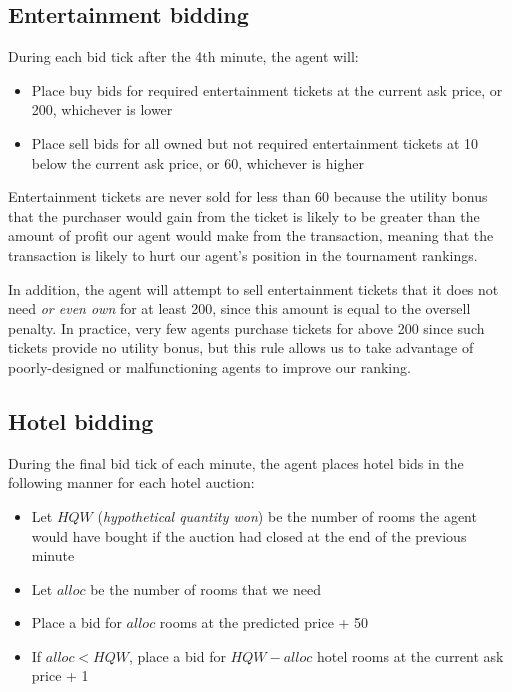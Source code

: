 \documentclass{acm_proc_article-sp}
\begin{document}
\subsection{Entertainment bidding}

During each bid tick after the 4th minute, the agent will:

\begin{itemize}
  \item Place buy bids for required entertainment tickets at the current ask price, or 200, whichever is lower
  \item Place sell bids for all owned but not required entertainment tickets at 10 below the current ask price, or 60, whichever is higher
\end{itemize}

Entertainment tickets are never sold for less than 60 because the utility bonus that the purchaser would gain from the ticket is likely to be greater than the amount of profit our agent would make from the transaction, meaning that the transaction is likely to hurt our agent's position in the tournament rankings.

In addition, the agent will attempt to sell entertainment tickets that it does not need \emph{or even own} for at least 200, since this amount is equal to the oversell penalty. In practice, very few agents purchase tickets for above 200 since such tickets provide no utility bonus, but this rule allows us to take advantage of poorly-designed or malfunctioning agents to improve our ranking.

\subsection{Hotel bidding}

During the final bid tick of each minute, the agent places hotel bids in the following manner for each hotel auction:

\begin{itemize}
  \item Let $HQW$ (\emph{hypothetical quantity won}) be the number of rooms the agent would have bought if the auction had closed at the end of the previous minute
  \item Let $alloc$ be the number of rooms that we need
  \item Place a bid for $alloc$ rooms at the predicted price + 50
  \item If $alloc < HQW$, place a bid for $HQW - alloc$ hotel rooms at the current ask price + 1
\end{itemize}
\end{document}
